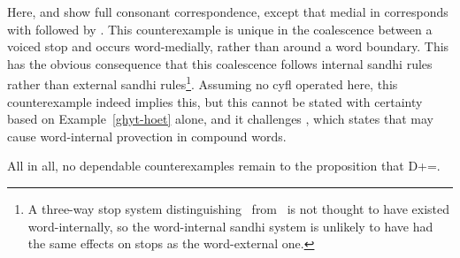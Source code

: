 Here,  and  show full consonant correspondence, except that medial  in  corresponds with  followed by . This counterexample is unique in the coalescence between a voiced stop and  occurs word-medially, rather than around a word boundary. This has the obvious consequence that this coalescence follows internal sandhi rules rather than external sandhi rules\footnote{A three-way stop system distinguishing \xD\ from \lT\ is not thought to have existed word-internally, so the word-internal sandhi system is unlikely to have had the same effects on stops as the word-external one.}.  Assuming no \gls{cyfl} operated here, this counterexample indeed implies this, but this cannot be stated with certainty based on Example~\ref{ghyt-hoet} alone, and it challenges \textcite[\S 17b]{evans_grammar_1964}, which states that  may cause word-internal provection in compound words. %

All in all, no dependable counterexamples remain to the proposition that \gls{D}+=\xT.
